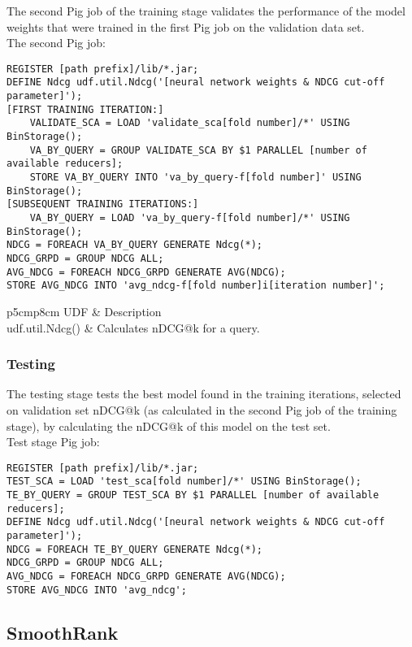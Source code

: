 The second Pig job of the training stage validates the performance of the model weights that were trained in the first Pig job on the validation data set.\\

The second Pig job:\\
\begin{minipage}{\linewidth}
\begin{lstlisting}
REGISTER [path prefix]/lib/*.jar;
DEFINE Ndcg udf.util.Ndcg('[neural network weights & NDCG cut-off parameter]');
[FIRST TRAINING ITERATION:]
	VALIDATE_SCA = LOAD 'validate_sca[fold number]/*' USING BinStorage();
	VA_BY_QUERY = GROUP VALIDATE_SCA BY $1 PARALLEL [number of available reducers];
	STORE VA_BY_QUERY INTO 'va_by_query-f[fold number]' USING BinStorage();
[SUBSEQUENT TRAINING ITERATIONS:]
	VA_BY_QUERY = LOAD 'va_by_query-f[fold number]/*' USING BinStorage();
NDCG = FOREACH VA_BY_QUERY GENERATE Ndcg(*);
NDCG_GRPD = GROUP NDCG ALL;
AVG_NDCG = FOREACH NDCG_GRPD GENERATE AVG(NDCG);
STORE AVG_NDCG INTO 'avg_ndcg-f[fold number]i[iteration number]';
\end{lstlisting}
\end{minipage}

\begin{table}
\centering
\begin{tabular}{p{5cm}p{8cm}}\toprule
UDF & Description \\
\midrule
udf.util.Ndcg() & Calculates \ac{nDCG}@k for a query.\\
\bottomrule
\end{tabular}
\caption{Description of training User Defined Functions (2/2)}
\label{tbl:training_udfs_2}
\end{table}

\subsubsection{Testing}
The testing stage tests the best model found in the training iterations, selected on validation set \ac{nDCG}@k (as calculated in the second Pig job of the training stage), by calculating the \ac{nDCG}@k of this model on the test set.\\

Test stage Pig job:\\
\begin{minipage}{\linewidth}
\begin{lstlisting}
REGISTER [path prefix]/lib/*.jar;
TEST_SCA = LOAD 'test_sca[fold number]/*' USING BinStorage();
TE_BY_QUERY = GROUP TEST_SCA BY $1 PARALLEL [number of available reducers];
DEFINE Ndcg udf.util.Ndcg('[neural network weights & NDCG cut-off parameter]');
NDCG = FOREACH TE_BY_QUERY GENERATE Ndcg(*);
NDCG_GRPD = GROUP NDCG ALL;
AVG_NDCG = FOREACH NDCG_GRPD GENERATE AVG(NDCG);
STORE AVG_NDCG INTO 'avg_ndcg';
\end{lstlisting}
\end{minipage}

\subsection{SmoothRank}